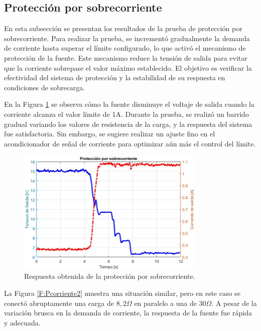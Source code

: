 \subsection{Protección por sobrecorriente}
En esta subsección se presentan los resultados de la prueba de protección por sobrecorriente. Para realizar la prueba, se incrementó gradualmente la demanda de corriente hasta superar el límite configurado, lo que activó el mecanismo de protección de la fuente. Este mecanismo reduce la tensión de salida para evitar que la corriente sobrepase el valor máximo establecido. El objetivo es verificar la efectividad del sistema de protección y la estabilidad de su respuesta en condiciones de sobrecarga. \par 
En la Figura \ref{F:Pcorriente1} se observa cómo la fuente disminuye el voltaje de salida cuando la corriente alcanza el valor límite de 1A. Durante la prueba, se realizó un barrido gradual variando los valores de resistencia de la carga, y la respuesta del sistema fue satisfactoria. Sin embargo, se sugiere realizar un ajuste fino en el acondicionador de señal de corriente para optimizar aún más el control del límite.\par 
\begin{figure}[htbp]
    \centering
    \includegraphics[width=0.8\textwidth]{./imagenes/MedicionConPuntaCorriente_proteccion.jpg}
    \caption{Respuesta obtenida de la protección por sobrecorriente.}
    \label{F:Pcorriente1}
\end{figure}\par 
La Figura \ref{F:Pcorriente2} muestra una situación similar, pero en este caso se conectó abruptamente una carga de $8,2\Omega$ en paralelo a una de $30\Omega$. A pesar de la variación brusca en la demanda de corriente, la respuesta de la fuente fue rápida y adecuada.\par 


